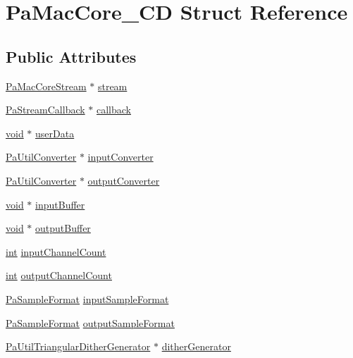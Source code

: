 \hypertarget{struct_pa_mac_core___c_d}{}\section{Pa\+Mac\+Core\+\_\+\+CD Struct Reference}
\label{struct_pa_mac_core___c_d}
\subsection*{Public Attributes}
\begin{DoxyCompactItemize}
\item 
\hyperlink{struct_pa_mac_core_stream}{Pa\+Mac\+Core\+Stream} $\ast$ \hyperlink{struct_pa_mac_core___c_d_af52f629e9fcb20d2f3086520fbaa6be4}{stream}
\item 
\hyperlink{portaudio_8h_a8a60fb2a5ec9cbade3f54a9c978e2710}{Pa\+Stream\+Callback} $\ast$ \hyperlink{struct_pa_mac_core___c_d_a024b45fca6d1eabbdde8f50a5e883424}{callback}
\item 
\hyperlink{sound_8c_ae35f5844602719cf66324f4de2a658b3}{void} $\ast$ \hyperlink{struct_pa_mac_core___c_d_acf9f9f10583107118ae4b745f0bb2c2a}{user\+Data}
\item 
\hyperlink{pa__converters_8h_a4f65f7c2e9e185e7f8caebe85ae9575c}{Pa\+Util\+Converter} $\ast$ \hyperlink{struct_pa_mac_core___c_d_a4ebda9f740ce9930daa5938753e9ef3b}{input\+Converter}
\item 
\hyperlink{pa__converters_8h_a4f65f7c2e9e185e7f8caebe85ae9575c}{Pa\+Util\+Converter} $\ast$ \hyperlink{struct_pa_mac_core___c_d_a65eae318a3f996d2162fee4a9f3142b9}{output\+Converter}
\item 
\hyperlink{sound_8c_ae35f5844602719cf66324f4de2a658b3}{void} $\ast$ \hyperlink{struct_pa_mac_core___c_d_aca96e90a66ea42995adfc2f685fec7ce}{input\+Buffer}
\item 
\hyperlink{sound_8c_ae35f5844602719cf66324f4de2a658b3}{void} $\ast$ \hyperlink{struct_pa_mac_core___c_d_abbbf395a8d4013bae17f68b48e4ae506}{output\+Buffer}
\item 
\hyperlink{xmltok_8h_a5a0d4a5641ce434f1d23533f2b2e6653}{int} \hyperlink{struct_pa_mac_core___c_d_a39c2b0bd092bfba57b3974cefccbf651}{input\+Channel\+Count}
\item 
\hyperlink{xmltok_8h_a5a0d4a5641ce434f1d23533f2b2e6653}{int} \hyperlink{struct_pa_mac_core___c_d_a9538805992c89f76929dfa936c8615a6}{output\+Channel\+Count}
\item 
\hyperlink{portaudio_8h_a4582d93c2c2e60e12be3d74c5fe00b96}{Pa\+Sample\+Format} \hyperlink{struct_pa_mac_core___c_d_a4f376ea13d81a8f38b70ddd750cc0930}{input\+Sample\+Format}
\item 
\hyperlink{portaudio_8h_a4582d93c2c2e60e12be3d74c5fe00b96}{Pa\+Sample\+Format} \hyperlink{struct_pa_mac_core___c_d_a388dc2135e2232ba6159022bae522443}{output\+Sample\+Format}
\item 
\hyperlink{struct_pa_util_triangular_dither_generator}{Pa\+Util\+Triangular\+Dither\+Generator} $\ast$ \hyperlink{struct_pa_mac_core___c_d_ae11eee81379e25fb2ca527dc053a7687}{dither\+Generator}
\end{DoxyCompactItemize}


